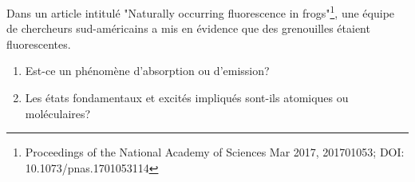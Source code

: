 
%
%
%
%
%
%
%
%
%
%
%
%


Dans un article intitulé "Naturally occurring fluorescence in frogs"\footnote{Proceedings of the National Academy of Sciences Mar 2017, 201701053; DOI: 10.1073/pnas.1701053114}, une équipe de
chercheurs sud-américains a mis en évidence que des grenouilles étaient fluorescentes.
\begin{enumerate}[\bf 1)]
	\item Est-ce un phénomène d'absorption ou d'emission?
	\item Les états fondamentaux et excités impliqués sont-ils atomiques ou moléculaires?
\end{enumerate}

